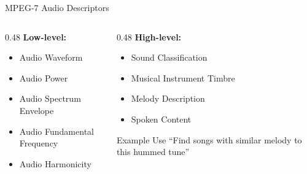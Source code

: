 \documentclass[aspectratio=169,12pt]{beamer}
\begin{document}
\begin{frame}{MPEG-7 Audio Descriptors}
    \begin{columns}
        \begin{column}{0.48\textwidth}
            \textbf{Low-level:}
            \begin{itemize}
                \item Audio Waveform
                \item Audio Power
                \item Audio Spectrum Envelope
                \item Audio Fundamental Frequency
                \item Audio Harmonicity
            \end{itemize}
        \end{column}
        \begin{column}{0.48\textwidth}
            \textbf{High-level:}
            \begin{itemize}
                \item Sound Classification
                \item Musical Instrument Timbre
                \item Melody Description
                \item Spoken Content
            \end{itemize}
            
            \vspace{0.3cm}
            \begin{block}{Example Use}
                ``Find songs with similar melody to this hummed tune''
            \end{block}
        \end{column}
    \end{columns}
\end{frame}
\end{document}
